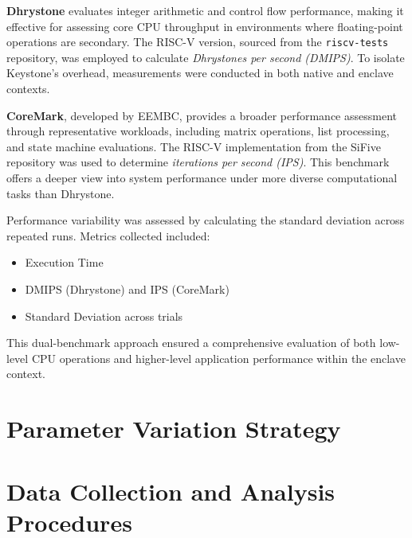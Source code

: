 \textbf{Dhrystone} evaluates integer arithmetic and control flow performance, making it effective for assessing core CPU throughput in environments where floating-point operations are secondary. The RISC-V version, sourced from the \texttt{riscv-tests} repository, was employed to calculate \textit{Dhrystones per second (DMIPS)}. To isolate Keystone’s overhead, measurements were conducted in both native and enclave contexts.

\textbf{CoreMark}, developed by EEMBC, provides a broader performance assessment through representative workloads, including matrix operations, list processing, and state machine evaluations. The RISC-V implementation from the SiFive repository was used to determine \textit{iterations per second (IPS)}. This benchmark offers a deeper view into system performance under more diverse computational tasks than Dhrystone.

Performance variability was assessed by calculating the standard deviation across repeated runs. Metrics collected included:
\begin{itemize}
\item Execution Time
\item DMIPS (Dhrystone) and IPS (CoreMark)
\item Standard Deviation across trials
\end{itemize}

This dual-benchmark approach ensured a comprehensive evaluation of both low-level CPU operations and higher-level application performance within the enclave context.
\section{Parameter Variation Strategy}

\section{Data Collection and Analysis Procedures}